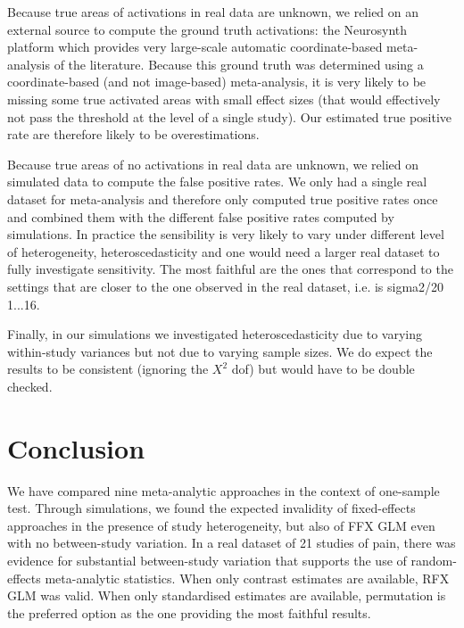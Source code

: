 \documentclass[preprint]{elsarticle}
\begin{document}

Because true areas of activations in real data are unknown, we relied on an external source to compute the ground truth activations: the Neurosynth platform which provides very large-scale automatic coordinate-based meta-analysis of the literature. Because this ground truth was determined using a coordinate-based (and not image-based) meta-analysis, it is very likely to be missing some true activated areas with small effect sizes (that would effectively not pass the threshold at the level of a single study). Our estimated true positive rate are therefore likely to be overestimations. 


Because true areas of no activations in real data are unknown, we relied on simulated data to compute the false positive rates. 
We only had a single real dataset for meta-analysis and therefore only computed true positive rates once and combined them with the different false positive rates computed by simulations. In practice the sensibility is very likely to vary under different level of heterogeneity, heteroscedasticity and one would need a larger real dataset to fully investigate sensitivity. The most faithful are the ones that correspond to the settings that are closer to the one observed in the real dataset, i.e. is sigma2/20 ~ 1...16. 

Finally, in our simulations we investigated heteroscedasticity due to varying within-study variances but not due to varying sample sizes. We do expect the results to be consistent (ignoring the $X^2$ dof) but would have to be double checked.


\section{Conclusion}\label{sec:ccl}
We have compared nine meta-analytic approaches in the context of one-sample test. Through simulations, we found the expected invalidity of fixed-effects approaches in the presence of study heterogeneity, but also of FFX GLM even with no between-study variation. In a real dataset of 21 studies of pain, there was evidence for substantial between-study variation that supports the use of random-effects meta-analytic statistics. When only contrast estimates are available, RFX GLM was valid. When only standardised estimates are available, permutation is the preferred option as the one providing the most faithful results. 
\end{document}
